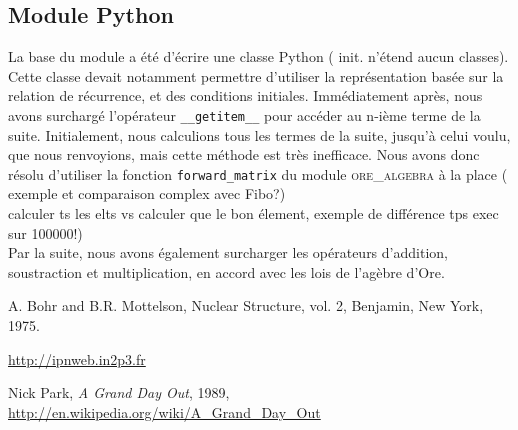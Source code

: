 \documentclass[final,12pt]{article}
\begin{document}
    \subsection{Module Python}
        \label{ssec:py}
        La base du module a été d'écrire une classe Python ({\color{red} init. n'étend aucun classes}). Cette classe devait notamment permettre
        d'utiliser la représentation basée sur la relation de récurrence, et des conditions initiales.
        Immédiatement après, nous avons surchargé l'opérateur \texttt{\_\_getitem\_\_} pour accéder
        au n-ième terme de la suite. Initialement, nous calculions tous les termes de la suite, jusqu'à 
        celui voulu, que nous renvoyions, mais cette méthode est très inefficace. Nous avons donc résolu
        d'utiliser la fonction \texttt{forward\_matrix} du module \textsc{ore\_algebra} à la place ({\color{red} exemple
        et comparaison complex avec Fibo?}) 
        \\{\color{red}calculer ts les elts vs calculer que le bon élement, exemple de différence tps exec sur 100000!})\\
        Par la suite, nous avons également surcharger les opérateurs d'addition, soustraction et multiplication, 
        en accord avec les lois de l'agèbre d'Ore.




\begin{thebibliography}{}
A. Bohr and B.R. Mottelson, Nuclear Structure, vol. 2, Benjamin,
New York, 1975.

 \url{http://ipnweb.in2p3.fr}

 Nick Park, \textsl{A Grand Day Out}, 1989, \url{http://en.wikipedia.org/wiki/A_Grand_Day_Out}

\end{thebibliography}
\end{document}
